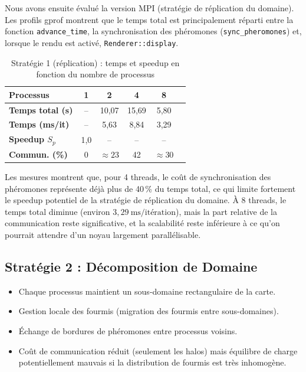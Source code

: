 \documentclass[12pt,a4paper]{article}
\begin{document}
Nous avons ensuite évalué la version MPI (stratégie de réplication du domaine). Les profils gprof montrent que le temps total est principalement réparti entre la fonction \texttt{advance\_time}, la synchronisation des phéromones (\texttt{sync\_pheromones}) et, lorsque le rendu est activé, \texttt{Renderer::display}.
\begin{table}[H]
    \centering
    \caption{Stratégie 1 (réplication) : temps et speedup en fonction du nombre de processus}
    \begin{tabular}{lccccc}
        \toprule
        \textbf{Processus} & \textbf{1} & \textbf{2} & \textbf{4} & \textbf{8} \\
        \midrule
        \textbf{Temps total (s)} 
            & -- 
            & 10{,}07 
            & 15{,}69 
            & 5{,}80  \\
        \textbf{Temps (ms/it)} 
            & -- 
            & 5{,}63 
            & 8{,}84 
            & 3{,}29  \\
        \textbf{Speedup $S_p$} 
            & 1{,}0 
            & -- 
            & -- 
            & --  \\
        \textbf{Commun. (\%)} 
            & 0 
            & $\approx 23$ 
            & 42 
            & $\approx 30$ \\
        \bottomrule
    \end{tabular}
\end{table}

Les mesures montrent que, pour 4 threads, le coût de synchronisation des phéromones représente déjà plus de 40\,\% du temps total, ce qui limite fortement le speedup potentiel de la stratégie de réplication du domaine. À 8 threads, le temps total diminue (environ $3{,}29~\text{ms/itération}$), mais la part relative de la communication reste significative, et la scalabilité reste inférieure à ce qu'on pourrait attendre d'un noyau largement parallélisable.

\subsection{Stratégie 2 : Décomposition de Domaine}
\begin{itemize}
    \item Chaque processus maintient un sous-domaine rectangulaire de la carte.
    \item Gestion locale des fourmis (migration des fourmis entre sous-domaines).
    \item Échange de bordures de phéromones entre processus voisins.
    \item Coût de communication réduit (seulement les halos) mais équilibre de charge potentiellement mauvais si la distribution de fourmis est très inhomogène.
\end{itemize}
\end{document}
